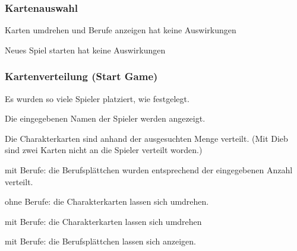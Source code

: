 		\subsubsection{Kartenauswahl}
			\begin{packed_itemize}
				\item[\(\square\)] Karten umdrehen und Berufe anzeigen hat keine Auswirkungen
				\item[\(\square\)] Neues Spiel starten hat keine Auswirkungen
			\end{packed_itemize}
		\subsubsection{Kartenverteilung (Start Game)}
			\begin{packed_itemize}
				\item[\(\square\)] Es wurden so viele Spieler platziert, wie festgelegt.
				\item[\(\square\)] Die eingegebenen Namen der Spieler werden angezeigt.
				\item[\(\square\)] Die Charakterkarten sind anhand der ausgesuchten Menge verteilt. (Mit Dieb sind zwei Karten nicht an die Spieler verteilt worden.)
				\item[\(\square\)] mit Berufe: die Berufsplättchen wurden entsprechend der eingegebenen Anzahl verteilt.
				\item[\(\square\)] ohne Berufe: die Charakterkarten lassen sich umdrehen.
				\item[\(\square\)] mit Berufe: die Charakterkarten lassen sich umdrehen
				\item[\(\square\)] mit Berufe: die Berufsplättchen lassen sich anzeigen.
			\end{packed_itemize}